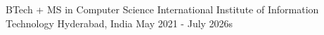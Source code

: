 
\begin{cventries}
  \cventry
    {BTech + MS in Computer Science} %
    {International Institute of Information Technology} %
    {Hyderabad, India} %
    {May 2021 - July 2026s} %
    {}
\end{cventries}
